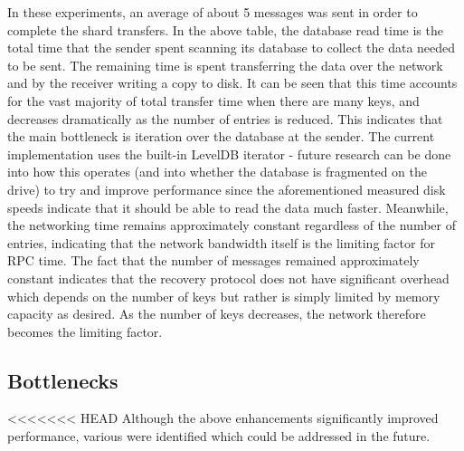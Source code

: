 \documentclass[letterpaper,10pt]{article}
\begin{document}
\begin{itemize}
In these experiments, an average of about 5 messages was sent in order
to complete the shard transfers.  In the above table, the database
read time is the total time that the sender spent scanning its
database to collect the data needed to be sent.  The remaining time is
spent transferring the data over the network and by the receiver
writing a copy to disk.  It can be seen that this time accounts for
the vast majority of total transfer time when there are many keys, and
decreases dramatically as the number of entries is reduced.  This
indicates that the main bottleneck is iteration over the database at
the sender.  The current implementation uses the built-in LevelDB
iterator - future research can be done into how this operates (and
into whether the database is fragmented on the drive) to try and
improve performance since the aforementioned measured disk speeds
indicate that it should be able to read the data much faster.
Meanwhile, the networking time remains approximately constant
regardless of the number of entries, indicating that the network
bandwidth itself is the limiting factor for RPC time.  The fact that
the number of messages remained approximately constant indicates that
the recovery protocol does not have significant overhead which depends
on the number of keys but rather is simply limited by memory capacity
as desired.  As the number of keys decreases, the network therefore
becomes the limiting factor.





\subsection{Bottlenecks}
<<<<<<< HEAD
Although the above enhancements significantly improved performance, various were identified which could be addressed in the future.


\end{itemize}
\end{document}
